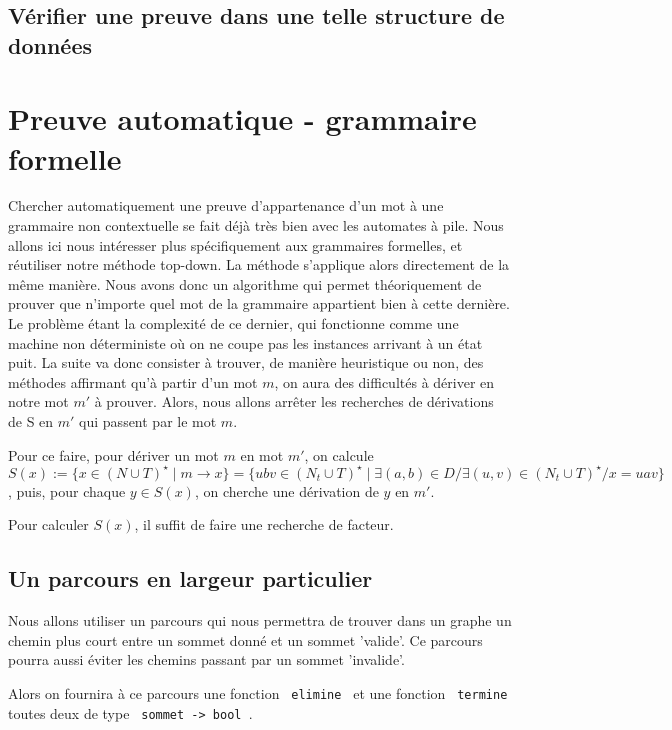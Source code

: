 \documentclass[a4paper,12pt]{article}
\begin{document}
\subsection{Vérifier une preuve dans une telle structure de données}



\section{Preuve automatique - grammaire formelle}

Chercher automatiquement une preuve d'appartenance d'un mot à une grammaire non contextuelle se fait déjà très bien avec les automates à pile.
Nous allons ici nous intéresser plus spécifiquement aux grammaires formelles, et réutiliser notre méthode top-down.
La méthode s'applique alors directement de la même manière.
Nous avons donc un algorithme qui permet théoriquement de prouver que n'importe quel mot de la grammaire appartient bien à cette dernière.
Le problème étant la complexité de ce dernier, qui fonctionne comme une machine non déterministe où on ne coupe pas les instances arrivant à un état puit.
La suite va donc consister à trouver, de manière heuristique ou non, des méthodes affirmant qu'à partir d'un mot $m$, on aura des difficultés à dériver en notre mot $m'$ à prouver.
Alors, nous allons arrêter les recherches de dérivations de S en $m'$ qui passent par le mot $m$.

Pour ce faire, pour dériver un mot $m$ en mot $m'$, on calcule $S(x) := \{x \in (N\cup T)^\star \mid m \rightarrow x\} 
=\{ubv \in (N_t \cup T)^\star \mid \exists (a,b) \in D / \exists (u,v)\in (N_t \cup T)^\star / x = uav\}$,
puis, pour chaque $ y \in S(x)$, on cherche une dérivation de $y$ en $m'$.

Pour calculer $S(x)$, il suffit de faire une recherche de facteur.






\subsection{Un parcours en largeur particulier}
Nous allons utiliser un parcours qui nous permettra de trouver dans un graphe un chemin plus court entre un sommet donné et un sommet 'valide'.
Ce parcours pourra aussi éviter les chemins passant par un sommet 'invalide'.

Alors on fournira à ce parcours une fonction \texttt{ elimine } et une fonction \texttt{ termine } toutes deux de type \texttt{ sommet -> bool }.
\end{document}
